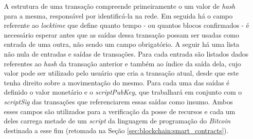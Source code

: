 A estrutura de uma transação compreende primeiramente o um valor de \textit{hash} para a mesma, responsável por identificá-la na rede. Em seguida há o campo referente ao \textit{locktime} que define quanto tempo - ou quantos blocos confirmados - é necessário esperar antes que as saídas dessa transação possam ser usadas como entrada de uma outra, não sendo um campo obrigatório. A seguir há uma lista não nula de entradas e saídas de transações. Para cada entrada são listados dados referentes ao \textit{hash} da transação anterior e também ao índice da saída dela, cujo valor pode ser utilizado pelo usuário que cria a transação atual, desde que este tenha direito sobre a movimentação do mesmo. Para cada uma das saídas é definido o valor monetário e o \textit{scriptPubKey}, que trabalhará em conjunto com o \textit{scriptSig} das transações que referenciarem essas saídas como insumo. Ambos esses campos são utilizados para a verificação da posse de recursos e cada um deles carrega metade de um \textit{script} da linguagem de programação do \textit{Bitcoin} destinada a esse fim (retomada na Seção \ref{sec:blockchain:smart_contracts}).

